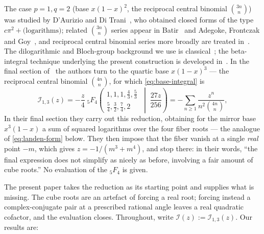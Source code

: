 \documentclass[11pt]{article}
\theoremstyle{definition}
\begin{document}
The case $p=1,q=2$ (base $x(1-x)^2$, the reciprocal central binomial $\binom{3n}{n}$) was studied by
D'Aurizio and Di Trani~\cite{DaurizioDiTrani}, who obtained closed forms of the type
$c\pi^2+\text{(logarithms)}$; related $\binom{3n}{n}$ series appear in Batir~\cite{Batir} and
Adegoke, Frontczak and Goy~\cite{AFG}, and reciprocal central binomial series more broadly are
treated in~\cite{Sprugnoli,Lehmer,Kaushik}. The dilogarithmic and Bloch-group background we use is
classical~\cite{Lewin,Zagier,LewinStructural,Maximon}; the beta-integral technique underlying the
present construction is developed in~\cite{HBanalytic}. In the final section of~\cite{DaurizioDiTrani} the authors
turn to the quartic base $x(1-x)^3$ --- the reciprocal central binomial $\binom{4n}{n}$, for which
\eqref{eq:base-integral} is
\begin{equation}\label{eq:5F4}
  \mathcal{I}_{1,3}(z)
  = -\frac{z}{4}\;{}_5F_4\!\left(\begin{matrix}1,1,1,\tfrac43,\tfrac53\\[2pt]
      \tfrac54,\tfrac32,\tfrac74,2\end{matrix}\;\middle|\;\frac{27z}{256}\right)
  = -\sum_{n\ge1}\frac{z^n}{n^2\binom{4n}{n}} ,
\end{equation}
In their final section they carry out this reduction, obtaining for the mirror base $x^3(1-x)$ a sum
of squared logarithms over the four fiber roots --- the analogue of \eqref{eq:landen-form} below.
They then impose that the fiber vanish at a single \emph{real} point $-m$, which gives
$z=-1/(m^3+m^4)$, and stop there: in their words, ``the final expression does not simplify as nicely
as before, involving a fair amount of cube roots.'' No evaluation of the ${}_5F_4$ is given.

The present paper takes the reduction as its starting point and supplies what is missing. The cube
roots are an artefact of forcing a real root; forcing instead a complex-conjugate pair at a
prescribed rational angle leaves a real quadratic cofactor, and the evaluation closes. Throughout, write $\mathcal{I}(z):=\mathcal{I}_{1,3}(z)$. Our results are:
\end{document}
